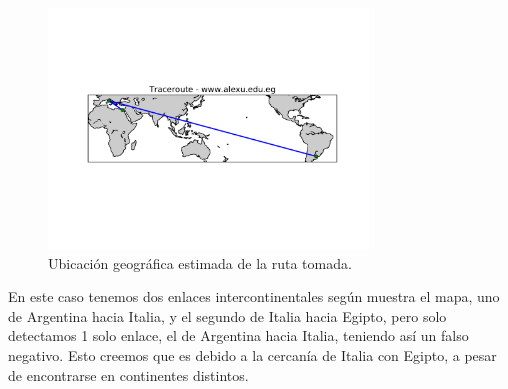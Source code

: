 \begin{figure}[H]
    \centering
    \includegraphics[width=8.5cm]{img/grafico3-www-alexu-edu-eg.pdf}
    \caption{\normalfont Ubicación geográfica estimada de la ruta tomada.}
\end{figure}

En este caso tenemos dos enlaces intercontinentales según muestra el mapa, uno de Argentina hacia Italia, y el segundo de Italia 
hacia Egipto, pero solo detectamos 1 solo enlace, el de Argentina hacia Italia, teniendo así un falso negativo. 
Esto creemos que es debido a la cercanía de Italia con Egipto, a pesar de encontrarse en continentes distintos. 


